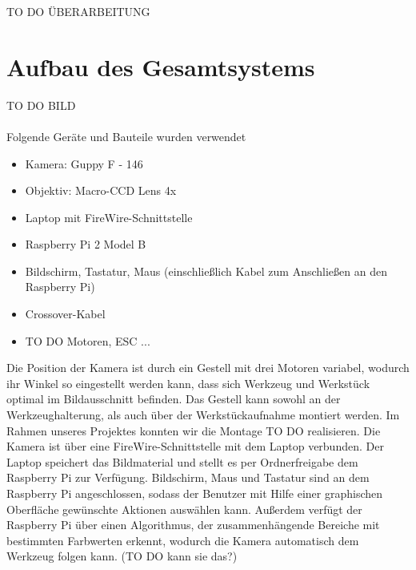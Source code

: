 \documentclass[a4paper]{report}
\begin{document}
TO DO ÜBERARBEITUNG

\chapter{Aufbau des Gesamtsystems}
TO DO BILD \\ \\
Folgende Geräte und Bauteile wurden verwendet
\begin{itemize} 
\item Kamera: Guppy F - 146
\item Objektiv: Macro-CCD Lens 4x
\item Laptop mit FireWire-Schnittstelle
\item Raspberry Pi 2 Model B 
\item Bildschirm, Tastatur, Maus (einschließlich Kabel zum Anschließen an den Raspberry Pi)
\item  Crossover-Kabel
\item  TO DO Motoren, ESC ...
\end{itemize}
Die Position der Kamera ist durch ein Gestell mit drei Motoren variabel, wodurch ihr Winkel so eingestellt werden kann, dass sich Werkzeug und Werkstück optimal im Bildausschnitt befinden. Das Gestell kann sowohl an der Werkzeughalterung, als auch über der Werkstückaufnahme montiert werden. Im Rahmen unseres Projektes konnten wir die Montage TO DO realisieren.
Die Kamera ist über eine FireWire-Schnittstelle mit dem Laptop verbunden. Der Laptop speichert das Bildmaterial und stellt es per Ordnerfreigabe dem Raspberry Pi zur Verfügung. Bildschirm, Maus und Tastatur sind an dem Raspberry Pi angeschlossen, sodass der Benutzer mit Hilfe einer graphischen Oberfläche gewünschte Aktionen auswählen kann. Außerdem verfügt der Raspberry Pi über einen Algorithmus, der zusammenhängende Bereiche mit bestimmten Farbwerten erkennt, wodurch die Kamera automatisch dem Werkzeug folgen kann. (TO DO kann sie das?)
\end{document}
